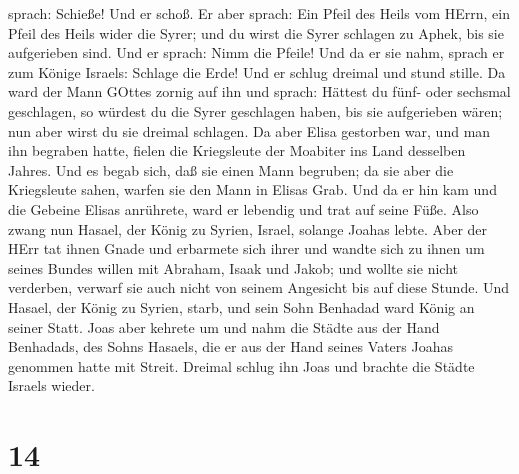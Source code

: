 sprach: Schieße! Und er schoß. Er aber sprach: Ein Pfeil des Heils vom
HErrn, ein Pfeil des Heils wider die Syrer; und du wirst die Syrer
schlagen zu Aphek, bis sie aufgerieben sind.  Und er
sprach: Nimm die Pfeile! Und da er sie nahm, sprach er zum Könige
Israels: Schlage die Erde! Und er schlug dreimal und stund stille.
 Da ward der Mann GOttes zornig auf ihn und sprach: Hättest
du fünf- oder sechsmal geschlagen, so würdest du die Syrer geschlagen
haben, bis sie aufgerieben wären; nun aber wirst du sie dreimal
schlagen.  Da aber Elisa gestorben war, und man ihn
begraben hatte, fielen die Kriegsleute der Moabiter ins Land desselben
Jahres.  Und es begab sich, daß sie einen Mann begruben; da
sie aber die Kriegsleute sahen, warfen sie den Mann in Elisas Grab. Und
da er hin kam und die Gebeine Elisas anrührete, ward er lebendig und
trat auf seine Füße.  Also zwang nun Hasael, der König zu
Syrien, Israel, solange Joahas lebte.  Aber der HErr tat
ihnen Gnade und erbarmete sich ihrer und wandte sich zu ihnen um seines
Bundes willen mit Abraham, Isaak und Jakob; und wollte sie nicht
verderben, verwarf sie auch nicht von seinem Angesicht bis auf diese
Stunde.  Und Hasael, der König zu Syrien, starb, und sein
Sohn Benhadad ward König an seiner Statt.  Joas aber
kehrete um und nahm die Städte aus der Hand Benhadads, des Sohns
Hasaels, die er aus der Hand seines Vaters Joahas genommen hatte mit
Streit. Dreimal schlug ihn Joas und brachte die Städte Israels wieder.

\hypertarget{section-13}{%
\section{14}\label{section-13}}


